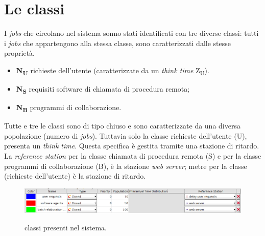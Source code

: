 \documentclass[../main.tex]{subfiles}
\begin{document}
    \section{Le classi}\label{sec:le-classi}
    I \textit{jobs} che circolano nel sistema sonno stati identificati con tre diverse classi: tutti i \textit{jobs}
    che appartengono alla stessa classe, sono caratterizzati dalle stesse proprietà.
    \begin{itemize}
        \item \textbf{N\textsubscript{U}} richieste dell'utente (caratterizzate da un \textit{think time} Z\textsubscript{U}).
        \item \textbf{N\textsubscript{S}} requisiti software di chiamata di procedura remota;
        \item \textbf{N\textsubscript{B}} programmi di collaborazione.
    \end{itemize}
    Tutte e tre le classi sono di tipo chiuso e sono caratterizzate da una diversa popolazione (numero di \textit{jobs}).
    Tuttavia solo la classe richieste dell'utente (U), presenta un \textit{think time}. Questa specifica è gestita
    tramite una stazione di ritardo.
    La \textit{reference station} per la classe chiamata di procedura remota (S) e per la classe programmi di collaborazione
    (B), è la stazione \textit{web server}; metre per la classe (richieste dell'utente) è la stazione di ritardo.
    \begin{figure}[H]
        \centering
        \includegraphics[scale = 0.5]{assets/classes.png}\\
        \caption[\textit{Classi} del sistema]{classi presenti nel sistema.}
        \label{fig:clssi-del-sistema}
    \end{figure}
\end{document}
